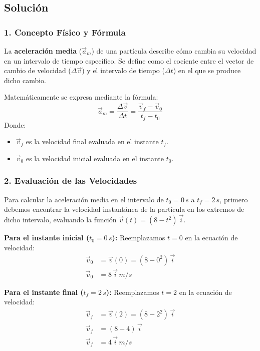 \documentclass[12pt, a4paper]{article}
\begin{document}
\subsection*{Solución}

\subsubsection*{1. Concepto Físico y Fórmula}
La \textbf{aceleración media} ($\vec{a}_m$) de una partícula describe cómo cambia su velocidad en un intervalo de tiempo específico. Se define como el cociente entre el vector de cambio de velocidad ($\Delta \vec{v}$) y el intervalo de tiempo ($\Delta t$) en el que se produce dicho cambio.

Matemáticamente se expresa mediante la fórmula:
$$ \vec{a}_m = \frac{\Delta \vec{v}}{\Delta t} = \frac{\vec{v}_f - \vec{v}_0}{t_f - t_0} $$
Donde:
\begin{itemize}
    \item $\vec{v}_f$ es la velocidad final evaluada en el instante $t_f$.
    \item $\vec{v}_0$ es la velocidad inicial evaluada en el instante $t_0$.
\end{itemize}

\subsubsection*{2. Evaluación de las Velocidades}
Para calcular la aceleración media en el intervalo de $t_0 = 0 \, \si{s}$ a $t_f = 2 \, \si{s}$, primero debemos encontrar la velocidad instantánea de la partícula en los extremos de dicho intervalo, evaluando la función $\vec{v}(t) = (8 - t^2) \, \vec{i}$.

\textbf{Para el instante inicial ($t_0 = 0 \, \si{s}$):}
Reemplazamos $t=0$ en la ecuación de velocidad:
\begin{align*}
    \vec{v}_0 &= \vec{v}(0) = (8 - 0^2) \, \vec{i} \\
    \vec{v}_0 &= 8 \, \vec{i} \, \si{m/s}
\end{align*}

\textbf{Para el instante final ($t_f = 2 \, \si{s}$):}
Reemplazamos $t=2$ en la ecuación de velocidad:
\begin{align*}
    \vec{v}_f &= \vec{v}(2) = (8 - 2^2) \, \vec{i} \\
    \vec{v}_f &= (8 - 4) \, \vec{i} \\
    \vec{v}_f &= 4 \, \vec{i} \, \si{m/s}
\end{align*}
\end{document}
